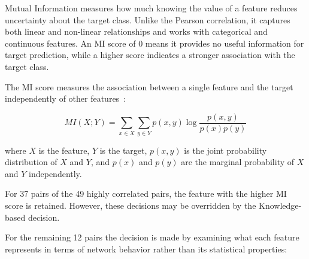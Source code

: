 Mutual Information measures how much knowing the value of a feature reduces uncertainty about the target class.  Unlike the Pearson correlation, it captures both linear and non-linear relationships and works with categorical and continuous features. An MI score of 0 means it provides no useful information for target prediction, while a higher score indicates a stronger association with the target class. 

\vspace{0.5cm}
The MI score measures the association between a single feature and the target independently of other features~\cite{MI}:

\begin{equation*}
    MI(X; Y) = \sum_{x \in X} \sum_{y \in Y} p(x, y) \log \frac{p(x, y)}{p(x)p(y)}
\end{equation*}

where $X$ is the feature, $Y$ is the target, $p(x, y)$ is the joint probability distribution of $X$ and $Y$, and $p(x)$ and $p(y)$ are the marginal probability of $X$ and $Y$ independently.

For 37 pairs of the 49 highly correlated pairs, the feature with the higher MI score is retained. However, these decisions may be overridden by the Knowledge-based decision.

For the remaining 12 pairs the decision is made by examining what each feature represents in terms of network behavior rather than its statistical properties:

